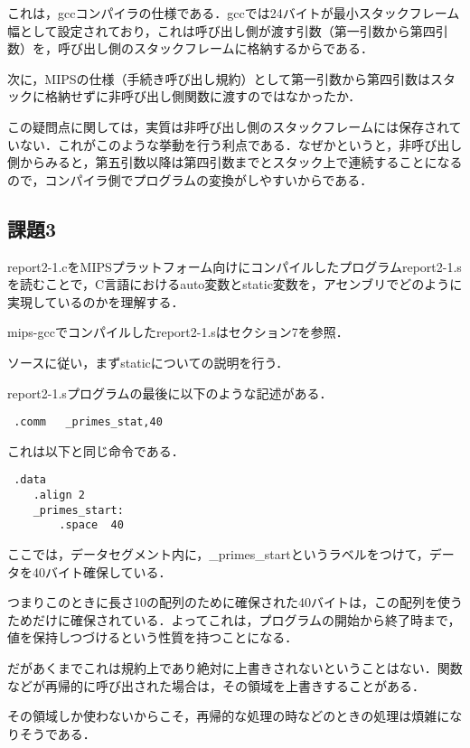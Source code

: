 \documentclass[a4j]{jarticle}
\begin{document}
これは，gccコンパイラの仕様である．gccでは24バイトが最小スタックフレーム幅として設定されており，これは呼び出し側が渡す引数（第一引数から第四引数）を，呼び出し側のスタックフレームに格納するからである．

次に，MIPSの仕様（手続き呼び出し規約）として第一引数から第四引数はスタックに格納せずに非呼び出し側関数に渡すのではなかったか．

この疑問点に関しては，実質は非呼び出し側のスタックフレームには保存されていない．これがこのような挙動を行う利点である．なぜかというと，非呼び出し側からみると，第五引数以降は第四引数までとスタック上で連続することになるので，コンパイラ側でプログラムの変換がしやすいからである．




\subsection{課題3}

report2-1.cをMIPSプラットフォーム向けにコンパイルしたプログラムreport2-1.sを読むことで，C言語におけるauto変数とstatic変数を，アセンブリでどのように実現しているのかを理解する．

mips-gccでコンパイルしたreport2-1.sはセクション7を参照．


ソースに従い，まずstaticについての説明を行う．

report2-1.sプログラムの最後に以下のような記述がある．

\begin{verbatim}
 .comm   _primes_stat,40
\end{verbatim}

これは以下と同じ命令である．

\begin{verbatim}
 .data
    .align 2
    _primes_start:
        .space  40
\end{verbatim}

ここでは，データセグメント内に，\_primes\_startというラベルをつけて，データを40バイト確保している．

つまりこのときに長さ10の配列のために確保された40バイトは，この配列を使うためだけに確保されている．よってこれは，プログラムの開始から終了時まで，値を保持しつづけるという性質を持つことになる．

だがあくまでこれは規約上であり絶対に上書きされないということはない．関数などが再帰的に呼び出された場合は，その領域を上書きすることがある．

その領域しか使わないからこそ，再帰的な処理の時などのときの処理は煩雑になりそうである．
\end{document}
